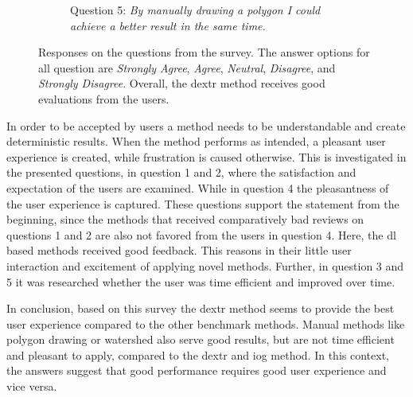 \begin{figure} [h!]
\begin{subfigure}[t]{0.48\textwidth}
		\caption{
			Question 5: \textit{By manually drawing a polygon I could achieve a better result in the same time.}
		} \label{fig:ch5:sec4:q5}
	\end{subfigure}
	\caption [Watershed User Interaction]{
		Responses on the questions from the survey.
		The answer options for all question are \textit{Strongly Agree}, \textit{Agree}, \textit{Neutral}, \textit{Disagree}, and \textit{Strongly Disagree}.
		Overall, the \gls{dextr} method receives good evaluations from the users.
	} \label{fig:ch5:sec4:suvery}
\end{figure}

In order to be accepted by users a method needs to be understandable and create deterministic results.
When the method performs as intended, a pleasant user experience is created, while frustration is caused otherwise.
This is investigated in the presented questions, in question 1 and 2, where the satisfaction and expectation of the users are examined.
While in question 4 the pleasantness of the user experience is captured.
These questions support the statement from the beginning, since the methods that received comparatively bad reviews on questions 1 and 2 are also not favored from the users in question 4.
Here, the \gls{dl} based methods received good feedback.
This reasons in their little user interaction and excitement of applying novel methods.
Further, in question 3 and 5 it was researched whether the user was time efficient and improved over time.

In conclusion, based on this survey the \gls{dextr} method seems to provide the best user experience compared to the other benchmark methods.
Manual methods like polygon drawing or watershed also serve good results, but are not time efficient and pleasant to apply, compared to the \gls{dextr} and \gls{iog} method.
In this context, the answers suggest that good performance requires good user experience and vice versa.

